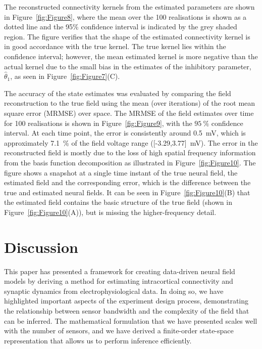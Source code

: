 \documentclass[12pt]{iopart}
\begin{document}
The reconstructed connectivity kernels from the estimated parameters are shown in Figure~\ref{fig:Figure8}, where the mean over the 100 realisations is shown as a dotted line and the 95\% confidence interval is indicated by the grey shaded region. The figure verifies that the shape of the estimated connectivity kernel is in good accordance with the true kernel. The true kernel lies within the confidence interval; however, the mean estimated kernel is more negative than the actual kernel due to the small bias in the estimates of the inhibitory parameter, $\hat\theta_1$, as seen in Figure~\ref{fig:Figure7}(C).

The accuracy of the state estimates was evaluated by comparing the field reconstruction to the true field using the mean (over iterations) of the root mean square error (MRMSE) over space. The MRMSE of the field estimates over time for 100 realisations is shown in Figure~\ref{fig:Figure9}, with the $95~\%$ confidence interval. At each time point, the error is consistently around 0.5~mV, which is approximately 7.1~\% of the field voltage range ([-3.29,3.77]~mV). The error in the reconstructed field is mostly due to the loss of high spatial frequency information from the basis function decomposition as illustrated in Figure~\ref{fig:Figure10}. The figure shows a snapshot at a single time instant of the true neural field, the estimated field and the corresponding error, which is the difference between the true and estimated neural fields. It can be seen in Figure~\ref{fig:Figure10}(B) that the estimated field contains the basic structure of the true field (shown in Figure~\ref{fig:Figure10}(A)), but is missing the higher-frequency detail.

\section{Discussion}\label{DiscussionSection}
This paper has presented a framework for creating data-driven neural field models by deriving a method for estimating intracortical connectivity and synaptic dynamics from electrophysiological data. In doing so, we have highlighted important aspects of the experiment design process, demonstrating the relationship between sensor bandwidth and the complexity of the field that can be inferred. The mathematical formulation that we have presented scales well with the number of sensors, and we have derived a finite-order state-space representation that allows us to perform inference efficiently. 
\end{document}
